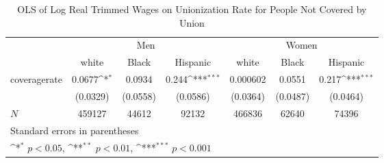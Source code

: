 \begin{table}[htbp]\centering
\def\sym#1{\ifmmode^{#1}\else\(^{#1}\)\fi}
\caption{OLS of Log Real Trimmed Wages on Unionization Rate for People Not Covered by Union}
\begin{tabular}{l*{6}{c}}
\hline\hline
            &\multicolumn{3}{c}{Men}                                          &\multicolumn{3}{c}{Women}                                        \\\cmidrule(lr){2-4}\cmidrule(lr){5-7}
            &\multicolumn{1}{c}{white}&\multicolumn{1}{c}{Black}&\multicolumn{1}{c}{Hispanic}&\multicolumn{1}{c}{white}&\multicolumn{1}{c}{Black}&\multicolumn{1}{c}{Hispanic}\\
\hline
coveragerate&      0.0677\sym{*}  &      0.0934         &       0.244\sym{***}&    0.000602         &      0.0551         &       0.217\sym{***}\\
            &    (0.0329)         &    (0.0558)         &    (0.0586)         &    (0.0364)         &    (0.0487)         &    (0.0464)         \\
\hline
\(N\)       &      459127         &       44612         &       92132         &      466836         &       62640         &       74396         \\
\hline\hline
\multicolumn{7}{l}{\footnotesize Standard errors in parentheses}\\
\multicolumn{7}{l}{\footnotesize \sym{*} \(p<0.05\), \sym{**} \(p<0.01\), \sym{***} \(p<0.001\)}\\
\end{tabular}
\end{table}

